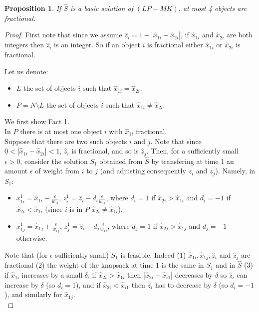\documentclass[a4paper]{book}
\newtheorem{prop}{Proposition}
\newtheorem{proof}{\noindent{\bf Proof.} }
\begin{document}
\begin{prop}\label{lem:2steps}
	If $\hat{S}$ is a basic solution of $(LP-MK)$, at most 4 objects are fractional. 
\end{prop}

\begin{proof}
 First note that since we assume $\hat{z}_i=1-|\hat{x}_{1i}-\hat{x}_{2i}|$,  if $\hat{x}_{1i}$ and $\hat{x}_{2i}$  are both integers then $\hat{z}_i$ is an integer. So if an object $i$ is fractional either $\hat{x}_{1i}$ or $\hat{x}_{2i}$ is fractional. 
  
 Let us denote:
 \begin{itemize}
 	\item $L$ the set of objects $i$ such that  $\hat{x}_{1i}=\hat{x}_{2i}$.
 	\item $P=N\setminus L$ the set of objects $i$ such that $\hat{x}_{1i}\neq \hat{x}_{2i}$.\\
 \end{itemize} 
 
We first show Fact 1.\\

 In $P$ there is at most one object $i$ with $\hat{x}_{1i}$ fractional.\\
 
Suppose that there are two such objects $i$ and $j$. Note that since $0<|\hat{x}_{1i}-\hat{x}_{2i}|<1$, $\hat{z}_i$  is fractional, and so is $\hat{z}_j$. Then, for a sufficiently small $\epsilon >0$, consider the solution $S_1$ obtained from $\hat{S}$ by transfering at time 1 an amount $\epsilon$ of weight from $i$ to $j$ (and adjusting consequently $z_i$ and $z_j$). Namely, in $S_1$:
\begin{itemize}
	\item $x^1_{1i}=\hat{x}_{1i}-\frac{\epsilon}{w_{1i}}$, $z^1_i=\hat{z}_i-d_i\frac{\epsilon}{w_{1i}}$, where $d_i=1$ if $\hat{x}_{2i}>\hat{x}_{1i}$ and $d_i=-1$ if $\hat{x}_{2i}<\hat{x}_{1i}$ (since $i$ is in $P$ $\hat{x}_{2i}\neq \hat{x}_{1i}$).
	\item $x^1_{1j}=\hat{x}_{1j}+\frac{\epsilon}{w_{1j}}$, $z^1_j=\hat{z}_i+d_j\frac{\epsilon}{w_{1j}}$, where $d_j=1$ if $\hat{x}_{2j}>\hat{x}_{1j}$ and $d_j=-1$ otherwise.
\end{itemize}
Note that (for $\epsilon$ sufficiently small) $S_1$ is feasible. Indeed (1) $\hat{x}_{1i},\hat{x}_{1j},\hat{z}_{i}$ and $\hat{z}_j$ are fractional (2) the weight of the knapsack at time 1 is the same in $S_1$ and in $\hat{S}$ (3) if $\hat{x}_{1i}$ increases by a small $\delta$, if $\hat{x}_{2i}>\hat{x}_{1i}$ then $|\hat{x}_{2i}-\hat{x}_{i1}|$ decreases by $\delta$ so $\hat{z}_i$ can increase by $\delta$ (so $d_i=1$), and if  $\hat{x}_{2i}<\hat{x}_{i1}$ then $\hat{z}_i$ has to decrease by $\delta$ (so $d_i=-1$),  and similarly for $\hat{x}_{1j}$. \\


\end{proof}
\end{document}
